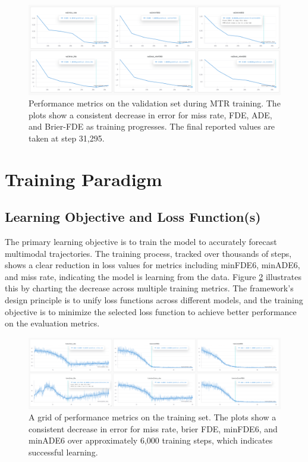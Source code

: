 \begin{figure}[h!]
    \centering
    \includegraphics[width=\textwidth]{figures/performance_metrics_validation.png}
    \caption{Performance metrics on the validation set during MTR training. The plots show a consistent decrease in error for miss rate, FDE, ADE, and Brier-FDE as training progresses. The final reported values are taken at step 31,295.}
    \label{fig:validation_metrics}
\end{figure}

\section{Training Paradigm}
\label{sec:model_training_paradigm}
\subsection{Learning Objective and Loss Function(s)}
\label{sec:model_loss_functions}
The primary learning objective is to train the model to accurately forecast multimodal trajectories. The training process, tracked over thousands of steps, shows a clear reduction in loss values for metrics including minFDE6, minADE6, and miss rate, indicating the model is learning from the data. Figure \ref{fig:training_metrics_grid} illustrates this by charting the decrease across multiple training metrics. The framework's design principle is to unify loss functions across different models, and the training objective is to minimize the selected loss function to achieve better performance on the evaluation metrics.

\begin{figure}[htbp]
    \centering
    \includegraphics[width=\textwidth]{figures/performance_metrics_training.png}
    \caption{A grid of performance metrics on the training set. The plots show a consistent decrease in error for miss rate, brier FDE, minFDE6, and minADE6 over approximately 6,000 training steps, which indicates successful learning.}
    \label{fig:training_metrics_grid}
\end{figure}

